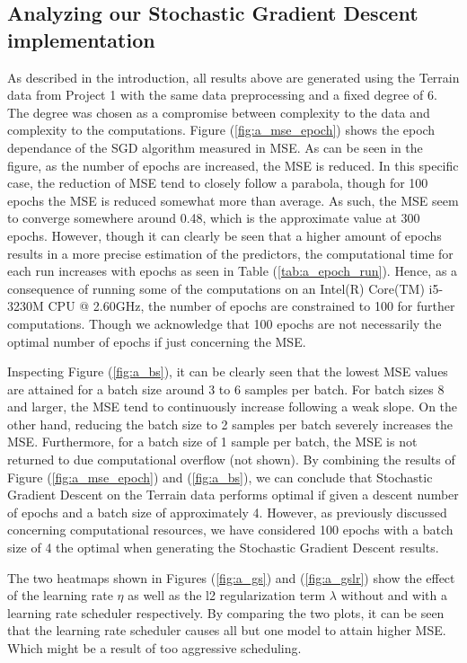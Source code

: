 \documentclass
[twocolumn,
secnumarabic,
nobibnotes,
aps,
prl,
reprint,
groupedaddress,
amsmath,
amssymb
]{revtex4-2}
\begin{document}
\subsection{Analyzing our Stochastic Gradient Descent implementation}
As described in the introduction, all results above are generated using the Terrain data from Project 1 with the same data preprocessing and a fixed degree of 6. The degree was chosen as a compromise between complexity to the data and complexity to the computations.
Figure (\ref{fig:a_mse_epoch}) shows the epoch dependance of the SGD algorithm measured in MSE. As can be seen in the figure, as the number of epochs are increased, the MSE is reduced. In this specific case, the reduction of MSE tend to closely follow a parabola, though for 100 epochs the MSE is reduced somewhat more than average. As such, the MSE seem to converge somewhere around 0.48, which is the approximate value at 300 epochs. However, though it can clearly be seen that a higher amount of epochs results in a more precise estimation of the predictors, the computational time for each run increases with epochs as seen in Table (\ref{tab:a_epoch_run}). Hence, as a consequence of running some of the computations on an Intel(R) Core(TM) i5-3230M CPU @ 2.60GHz, the number of epochs are constrained to 100 for further computations. Though we acknowledge that 100 epochs are not necessarily the optimal number of epochs if just concerning the MSE.

Inspecting Figure (\ref{fig:a_bs}), it can be clearly seen that the lowest MSE values are attained for a batch size around 3 to 6 samples per batch. For batch sizes 8 and larger, the MSE tend to continuously increase following a weak slope. On the other hand, reducing the batch size to 2 samples per batch severely increases the MSE. Furthermore, for a batch size of 1 sample per batch, the MSE is not returned to due computational overflow (not shown). By combining the results of Figure (\ref{fig:a_mse_epoch}) and (\ref{fig:a_bs}), we can conclude that Stochastic Gradient Descent on the Terrain data performs optimal if given a descent number of epochs and a batch size of approximately 4. However, as previously discussed concerning computational resources, we have considered 100 epochs with a batch size of 4 the optimal when generating the Stochastic Gradient Descent results.

The two heatmaps shown in Figures (\ref{fig:a_gs}) and (\ref{fig:a_gslr}) show the effect of the learning rate $\eta$ as well as the l2 regularization term $\lambda$ without and with a learning rate scheduler respectively. By comparing the two plots, it can be seen that the learning rate scheduler causes all but one model to attain higher MSE. Which might be a result of too aggressive scheduling.
\end{document}
